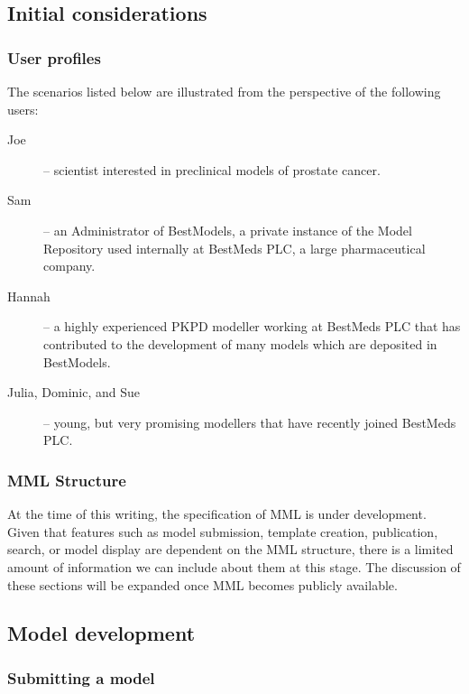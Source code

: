 \subsection{Initial considerations}
\subsubsection{User profiles}
\label{userProfiles}
The scenarios listed below are illustrated from the perspective of the following users:
\begin{description}
    \item[Joe] -- scientist interested in preclinical models of prostate cancer.
    \item[Sam] -- an Administrator of BestModels, a private instance of the \ddmore Model Repository used internally at BestMeds PLC, a large pharmaceutical company.
    \item[Hannah] -- a highly experienced PKPD modeller working at BestMeds PLC that has contributed to the development of many models which are deposited in BestModels.
    \item[Julia, Dominic, and Sue] -- young, but very promising modellers that have recently joined BestMeds PLC.
\end{description}

\subsubsection{MML Structure}
At the time of this writing, the specification of MML is under development. Given that features such as model submission, template creation, publication, search, or model display are dependent on the MML structure, there is a limited amount of information we can include about them at this stage. The discussion of these sections will be expanded once MML becomes publicly available.

\subsection{Model development}

\subsubsection{Submitting a model}


